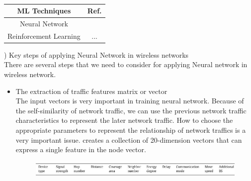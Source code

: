 \documentclass[11pt]{report}
\begin{document}
	
	\begin{table}[!h]
		\centering
		\caption{}
		\begin{tabular}{c|c}
			\toprule
			ML Techniques & Ref.\\
			\hline
			Neural Network & \cite{7792369} \cite{7935536} \cite{8088549} \cite{8489985} \cite{8485423}\\
			\hline
			Reinforcement Learning & \cite{4411037} \cite{5408367} \cite{DBLP:journals/corr/abs-1709-07080} \cite{doi:10.1155/2015/618072}...\\
			\hline
		\end{tabular}
	\end{table}
     ) Key steps of applying Neural Network in wireless networks\\     
     \noindent There are several steps that we need to consider for applying Neural network in wireless network.  
    \begin{itemize}
    	\item The extraction of traffic features matrix or vector\\
    	The input vectors is very important in training neural network. Because of the self-similarity of network traffic, we can use the previous network traffic characteristics to represent the later network traffic. How to choose the appropriate parameters to represent the relationship of network traffics is a very important issue. \cite{YangMinLee} creates a collection of 20-dimension vectors that can express a single feature in the node vector. \\
    	\begin{figure}[h!]
    		\centering
    		\includegraphics[width=0.9\linewidth]{figure4.jpg}
    		\caption{}
    		\label{2thfig}
    	\end{figure}\\
    \end{itemize}
\end{document}
